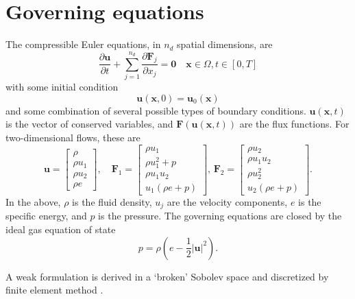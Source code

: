 \documentclass[11pt]{article}
\let\bld\boldsymbol
\begin{document}
\section{Governing equations}

The compressible Euler equations, in $n_d$ spatial dimensions, are
\begin{equation}
\frac{\partial \bld{u}}{\partial t} + \sum_{j=1}^{n_d} \frac{\partial \bld{F}_j}{\partial x_j} = \bld{0} \quad \bld{x} \in \Omega, t \in [0,T]
\label{conservativeGE}
\end{equation}
with some initial condition
\begin{equation}
\bld{u}(\bld{x},0) = \bld{u}_0(\bld{x})
\end{equation}
and some combination of several possible types of boundary conditions.
$\bld{u}(\bld{x},t)$ is the vector of conserved variables, and $\bld{F}(\bld{u}(\bld{x},t))$ are the flux functions. For two-dimensional flows, these are
\begin{equation}
\bld{u} = 
\begin{bmatrix}
\rho \\ \rho u_1 \\ \rho u_2 \\ \rho e
\end{bmatrix}, \quad
\bld{F}_1 = 
\begin{bmatrix}
\rho u_1 \\ \rho u_1^2 + p \\ \rho u_1 u_2 \\ u_1 (\rho e + p)
\end{bmatrix}, \,
\bld{F}_2 = 
\begin{bmatrix}
\rho u_2 \\ \rho u_1 u_2 \\ \rho u_2^2 \\ u_2 (\rho e + p)
\end{bmatrix}.
\end{equation}
In the above, $\rho$ is the fluid density, $u_j$ are the velocity components, $e$ is the specific energy, and $p$ is the pressure. The governing equations are closed by the ideal gas equation of state
\begin{equation}
p = \rho (e - \frac12 \vert \bld{u} \vert^2).
\end{equation}

A weak formulation is derived in a `broken' Sobolev space and discretized by finite element method \cite{luo_taylor}.
\end{document}

